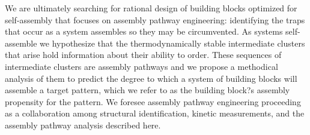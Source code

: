 We are ultimately searching for rational design of building blocks optimized for self-assembly that focuses on assembly pathway engineering: identifying the traps that occur as a system assembles so they may be circumvented.
As systems self-assemble we hypothesize that the thermodynamically stable intermediate clusters that arise hold information about their ability to order. 
These sequences of intermediate clusters are assembly pathways and we propose a methodical analysis of them to predict the degree to which a system of building blocks will assemble a target pattern, which we refer to as the building block?s assembly propensity for the pattern.
We foresee assembly pathway engineering proceeding as a collaboration among structural identification, kinetic measurements, and the assembly pathway analysis described here. \cite{Jankowski_2012_SoftMatter}
